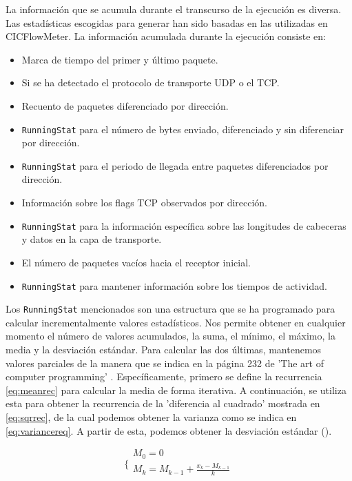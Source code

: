 \documentclass[10pt,a4paper,twoside]{article}
\begin{document}
\begin{multicols*}{2}

    La información que se acumula durante el transcurso de la ejecución es diversa. Las estadísticas escogidas para generar han sido basadas en las utilizadas en CICFlowMeter. La información acumulada durante la ejecución consiste en:

    \begin{itemize}
        \item Marca de tiempo del primer y último paquete.
        \item Si se ha detectado el protocolo de transporte UDP o el TCP.
        \item Recuento de paquetes diferenciado por dirección.
        \item \texttt{RunningStat} para el número de bytes enviado, diferenciado y sin diferenciar por dirección.
        \item \texttt{RunningStat} para el periodo de llegada entre paquetes diferenciados por dirección.
        \item Información sobre los flags TCP observados por dirección.
        \item \texttt{RunningStat} para la información específica sobre las longitudes de cabeceras y datos en la capa de transporte.
        \item El número de paquetes vacíos hacia el receptor inicial.
        \item \texttt{RunningStat} para mantener información sobre los tiempos de actividad.
    \end{itemize}

    Los \texttt{RunningStat} mencionados son una estructura que se ha programado para calcular incrementalmente valores estadísticos. Nos permite obtener en cualquier momento el número de valores acumulados, la suma, el mínimo, el máximo, la media y la desviación estándar. Para calcular las dos últimas, mantenemos valores parciales de la manera que se indica en la página 232 de 'The art of computer programming' \cite{10.5555/270146}. Específicamente, primero se define la recurrencia \ref{eq:meanrec} para calcular la media de forma iterativa. A continuación, se utiliza esta para obtener la recurrencia de la 'diferencia al cuadrado' mostrada en \ref{eq:sqrrec}, de la cual podemos obtener la varianza como se indica en \ref{eq:variancereq}. A partir de esta, podemos obtener la desviación estándar (\sigma).

    \begin{equation} \label{eq:meanrec}
        \biggl\{
            \begin{array}{l}
              M_{0} = 0\\
              M_{k} = M_{k-1} + {\frac{ x_{k} - M_{k-1} }{k}}  \\
            \end{array} 
    \end{equation}
    

\end{multicols*}
\end{document}
